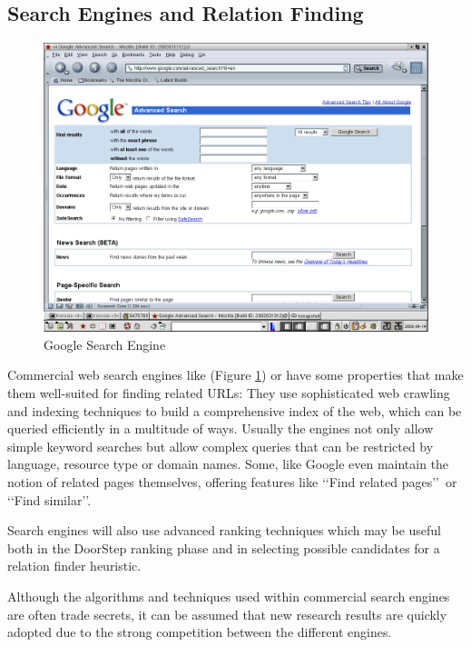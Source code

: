 \documentclass[a4paper]{danarticle}
\theoremstyle{remark}
\begin{document}
     \subsection{Search Engines and Relation Finding}
       \begin{figure}[ht]
         \centering
         \includegraphics[width=12cm]{googleadv}
         \caption{Google Search Engine}
         \label{googleadv}
       \end{figure}
       Commercial web search engines like \cite{google} (Figure \ref{googleadv})
       or \cite{altavista} have 
       some properties that make them well-suited for finding related URLs: They 
       use sophisticated web crawling and indexing techniques to build a 
       comprehensive index of the web, which can be queried efficiently in 
       a multitude of ways. Usually the engines not only allow simple keyword 
       searches but allow complex queries that can be restricted by language, 
       resource type or domain names. Some, like Google\cite{google} 
       even maintain the notion of related pages themselves, offering features like 
       \lq\lq Find related pages\rq\rq\ or \lq\lq Find similar\rq\rq . 
  
       Search engines will also use advanced ranking techniques which may be
       useful both in the DoorStep ranking phase and in selecting possible
       candidates for a relation finder heuristic.
       
       Although the algorithms and techniques used within commercial search 
       engines are often trade secrets, it can be assumed 
       that new research results are quickly adopted due to the strong 
       competition between the different engines.
       
\end{document}
